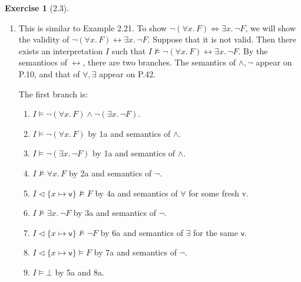 \documentclass[12pt, psamsfonts]{amsart}
\theoremstyle{definition}
\newtheorem*{exer}{Exercise}
\theoremstyle{remark}
\numberwithin{equation}{subsection}
\begin{document}
\begin{exer}[2.3]
    $ $
    \begin{enumerate}[label=(\alph*)]
        \item %
            This is similar to Example 2.21.
            To show $\neg(\forall x.\, F) \Leftrightarrow \exists x.\, \neg F$, we will show the validity of $\neg(\forall x.\, F) \leftrightarrow \exists x.\, \neg F$.
            Suppose that it is not valid.
            Then there exists an interpretation $I$ such that $I \not\models \neg(\forall x.\, F) \leftrightarrow \exists x.\, \neg F$.
            By the semantiocs of $\leftrightarrow$, there are two branches.
            The semantics of $\land, \neg$ appear on P.10, and that of $\forall, \exists$ appear on P.42.

            The first branch is:
            \begin{enumerate}[label=\arabic*a.]
                \item %
                    $I \models \neg(\forall x.\, F) \land \neg(\exists x.\, \neg F)$.
                \item %
                    $I \models \neg(\forall x.\, F)$ by 1a and semantics of $\land$.
                \item %
                    $I \models \neg(\exists x.\, \neg F)$ by 1a and semantics of $\land$.
                \item %
                    $I \not\models \forall x.\, F$ by 2a and semantics of $\neg$.
                \item %
                    $I \vartriangleleft \{ x \mapsto \textsf{v} \} \not\models F$ by 4a and semantics of $\forall$ for some fresh \textsf{v}.
                \item %
                    $I \not \models \exists x.\, \neg F$ by 3a and semantics of $\neg$.
                \item %
                    $I \vartriangleleft \{ x \mapsto \textsf{v} \} \not\models \neg F$ by 6a and semantics of $\exists$ for the same $\textsf{v}$.
                \item %
                    $I \vartriangleleft \{ x \mapsto \textsf{v} \} \models F$ by 7a and semantics of $\neg$.
                \item %
                    $I \models \bot$ by 5a and 8a.
            \end{enumerate}


\end{enumerate}
\end{exer}
\end{document}
